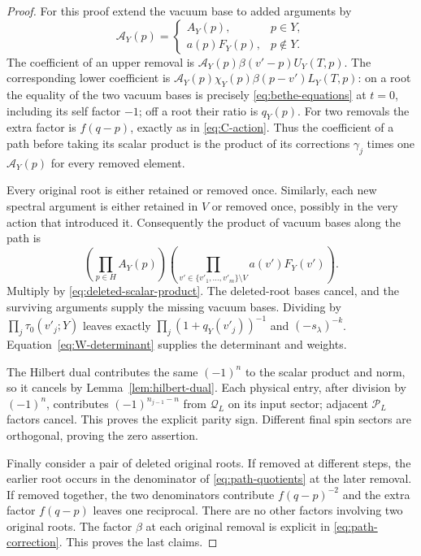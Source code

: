 \begin{proof}
For this proof extend the vacuum base to added arguments by
\[
 \mathcal A_Y(p)=
 \begin{cases}
  A_Y(p),&p\in Y,\\
  a(p)F_Y(p),&p\notin Y.
 \end{cases}
\]
The coefficient of an upper removal is
$\mathcal A_Y(p)\beta(v'-p)U_Y(T,p)$.
The corresponding lower coefficient is
$\mathcal A_Y(p)\chi_Y(p)\beta(p-v')L_Y(T,p)$:
on a root the equality of the two vacuum bases is precisely
\eqref{eq:bethe-equations} at $t=0$, including its self factor $-1$;
off a root their ratio is $q_Y(p)$.
For two removals the extra factor is $f(q-p)$, exactly as in
\eqref{eq:C-action}.  Thus the coefficient of a path before taking its
scalar product is the product of its corrections $\gamma_j$ times one
$\mathcal A_Y(p)$ for every removed element.

Every original root is either retained or removed once.  Similarly,
each new spectral argument is either retained in $V$ or removed once,
possibly in the very action that introduced it.  Consequently the
product of vacuum bases along the path is
\[
 \left(\prod_{p\in H}A_Y(p)\right)
 \left(\prod_{v'\in\{v'_1,\ldots,v'_m\}\setminus V}
                       a(v')F_Y(v')\right).
\]
Multiply by \eqref{eq:deleted-scalar-product}.  The deleted-root bases
cancel, and the surviving arguments supply the missing vacuum bases.
Dividing by $\prod_j\tau_0(v'_j;Y)$ leaves exactly
$\prod_j(1+q_Y(v'_j))^{-1}$ and $(-s_\lambda)^{-k}$.
Equation~\eqref{eq:W-determinant} supplies the determinant and weights.

The Hilbert dual contributes the same $(-1)^n$ to the scalar product
and norm, so it cancels by Lemma~\ref{lem:hilbert-dual}.  Each physical
entry, after division by $(-1)^n$, contributes
$(-1)^{n_{j-1}-n}$ from $\mathcal Q_L$ on its input sector; adjacent
$\mathcal P_L$ factors cancel.  This proves the explicit parity sign.
Different final spin sectors are orthogonal, proving the zero
assertion.

Finally consider a pair of deleted original roots.  If removed at
different steps, the earlier root occurs in the denominator of
\eqref{eq:path-quotients} at the later removal.  If removed together,
the two denominators contribute $f(q-p)^{-2}$ and the extra factor
$f(q-p)$ leaves one reciprocal.  There are no other factors involving
two original roots.  The factor $\beta$ at each original removal is
explicit in \eqref{eq:path-correction}.  This proves the last claims.
\end{proof}

